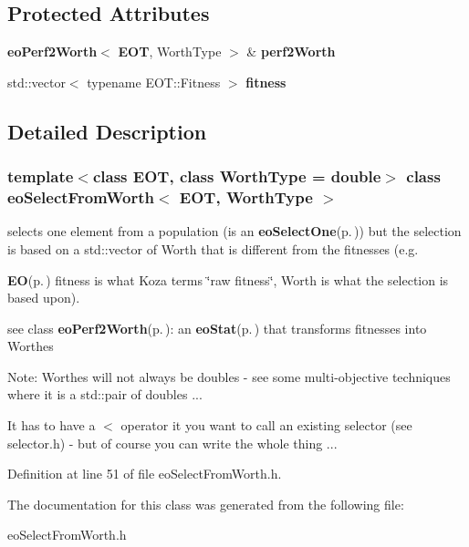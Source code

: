 \subsection*{Protected Attributes}
\begin{CompactItemize}
\item 
{\bf eo\-Perf2Worth}$<$ {\bf EOT}, Worth\-Type $>$ \& {\bf perf2Worth}\label{classeo_select_from_worth_p0}

\item 
std::vector$<$ typename EOT::Fitness $>$ {\bf fitness}\label{classeo_select_from_worth_p1}

\end{CompactItemize}


\subsection{Detailed Description}
\subsubsection*{template$<$class EOT, class Worth\-Type = double$>$ class eo\-Select\-From\-Worth$<$ EOT, Worth\-Type $>$}

selects one element from a population (is an {\bf eo\-Select\-One}{\rm (p.\,\pageref{classeo_select_one})}) but the selection is based on a std::vector of Worth that is different from the fitnesses (e.g. 

{\bf EO}{\rm (p.\,\pageref{class_e_o})} fitness is what Koza terms \char`\"{}raw fitness\char`\"{}, Worth is what the selection is based upon).

see class {\bf eo\-Perf2Worth}{\rm (p.\,\pageref{classeo_perf2_worth})}: an {\bf eo\-Stat}{\rm (p.\,\pageref{classeo_stat})} that transforms fitnesses into Worthes

Note: Worthes will not always be doubles - see some multi-objective techniques where it is a std::pair of doubles ...

It has to have a $<$ operator it you want to call an existing selector (see selector.h) - but of course you can write the whole thing ... 



Definition at line 51 of file eo\-Select\-From\-Worth.h.

The documentation for this class was generated from the following file:\begin{CompactItemize}
\item 
eo\-Select\-From\-Worth.h\end{CompactItemize}
